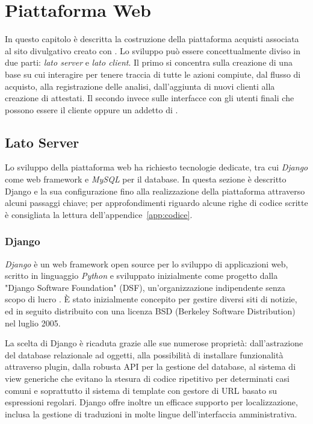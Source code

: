 \chapter{Piattaforma Web}
\label{chp:sviluppo}
In questo capitolo è descritta la costruzione della piattaforma acquisti associata al sito divulgativo creato con {\wp}. Lo sviluppo può essere concettualmente diviso in due parti: \emph{lato server} e \emph{lato client}. Il primo si concentra sulla creazione di una base su cui interagire per tenere traccia di tutte le azioni compiute, dal flusso di acquisto, alla registrazione delle analisi, dall'aggiunta di nuovi clienti alla creazione di attestati. Il secondo invece sulle interfacce con gli utenti finali che possono essere il cliente oppure un addetto di {\fem}.

\section{Lato Server}
\label{sec:server}
Lo sviluppo della piattaforma web ha richiesto tecnologie dedicate, tra cui \emph{Django} come web framework e \emph{MySQL} per il database. In questa sezione è descritto Django e la sua configurazione fino alla realizzazione della piattaforma attraverso alcuni passaggi chiave; per approfondimenti riguardo alcune righe di codice scritte è consigliata la lettura dell'appendice~\ref{app:codice}.

\subsection{Django}
\label{subs:django}
\emph{Django} è un web framework open source per lo sviluppo di applicazioni web, scritto in linguaggio \emph{Python} e sviluppato inizialmente come progetto dalla "Django Software Foundation" (DSF), un'organizzazione indipendente senza scopo di lucro \cite{django}. È stato inizialmente concepito per gestire diversi siti di notizie, ed in seguito distribuito con una licenza BSD (Berkeley Software Distribution) nel luglio 2005.

La scelta di Django è ricaduta grazie alle sue numerose proprietà: dall'astrazione del database relazionale ad oggetti, alla
possibilità di installare funzionalità attraverso plugin, dalla robusta API per la gestione del database, al sistema di view generiche che evitano la stesura di codice ripetitivo per determinati casi comuni e soprattutto il sistema di template con gestore di URL basato su espressioni regolari. Django offre inoltre un efficace supporto per localizzazione, inclusa la gestione di traduzioni in molte lingue dell'interfaccia amministrativa.

